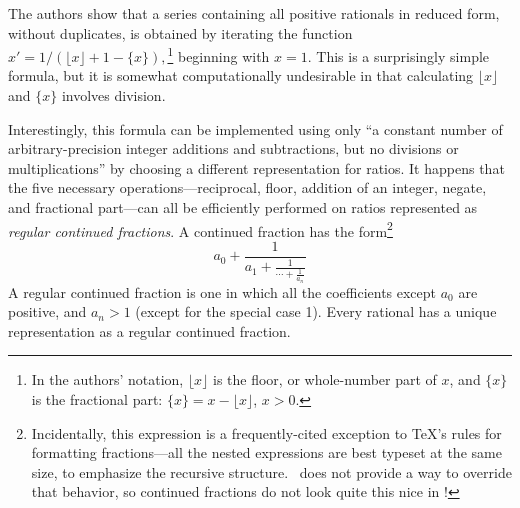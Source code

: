 The authors show that a series containing all positive rationals in reduced form, without duplicates, is obtained by iterating the function 
$x' = 1/{(\lfloor x \rfloor + 1 - \{x\})},$\footnote{In the authors' notation, $\lfloor x \rfloor$ is the floor, or whole-number part of $x$, and $\{x\}$ is the fractional part: $\{x\} = x - \lfloor x \rfloor$, $x > 0$.} beginning with $x=1$. This is a surprisingly simple formula, but it is somewhat computationally undesirable in that calculating $\lfloor x \rfloor$ and $\{x\}$ involves division.

Interestingly, this formula can be implemented using only ``a constant number of arbitrary-precision integer additions and subtractions, but no divisions or multiplications'' by choosing a different representation for ratios. It happens that the five necessary operations---reciprocal, floor, addition of an integer, negate, and fractional part---can all be efficiently performed on ratios represented as \emph{regular continued fractions}. A continued fraction has the form\footnote{Incidentally, this expression is a frequently-cited exception to \TeX's rules for formatting fractions---all the nested expressions are best typeset at the same size, to emphasize the recursive structure. \Meta\ does not provide a way to override that behavior, so continued fractions do not look quite this nice in \Meta!}
$$a_0 + \frac{1}{
    \displaystyle a_1 + \frac{\displaystyle 1}{
        \displaystyle \cdots + \frac{\displaystyle 1}{
            \displaystyle a_n}}}$$
A regular continued fraction is one in which all the coefficients except $a_0$ are positive, and $a_n > 1$ (except for the special case 1). Every rational has a unique representation as a regular continued fraction.

